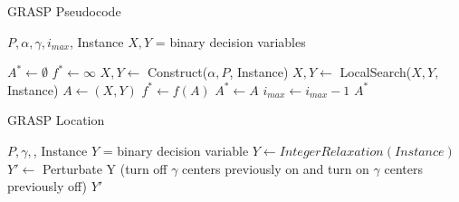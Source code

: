 \documentclass{beamer}
\begin{document}
\begin{frame}{GRASP Pseudocode}
        \begin{algorithmic}[1]
        
        \REQUIRE $P, \alpha, \gamma, i_{max}$, Instance
        \ENSURE $X,Y$ = binary decision variables
        
        \STATE $A^* \gets \emptyset$
        \STATE $f^* \gets \infty$
            \STATE $X, Y \gets$ Construct($\alpha, P$, Instance)
            \STATE $X, Y \gets$ LocalSearch($X, Y,$ Instance)
            \STATE $A \gets (X, Y)$
                \STATE $f^* \gets f(A)$
                \STATE $A^* \gets A$ 
            \ENDIF
            \STATE $i_{max} \gets i_{max} - 1$
        \ENDWHILE
        \RETURN $A^*$
        \end{algorithmic}
\end{frame}

\begin{frame}{GRASP Location}
\begin{algorithmic}[1]
    \REQUIRE $P, \gamma,$, Instance
        \ENSURE $Y$ = binary decision variable
        \STATE $Y \gets IntegerRelaxation(Instance)$
        \STATE $Y' \gets$ Perturbate Y (turn off $\gamma$ centers previously on and turn on $\gamma$ centers previously off)
        \RETURN $Y'$
\end{algorithmic}
    
\end{frame}
\end{document}
